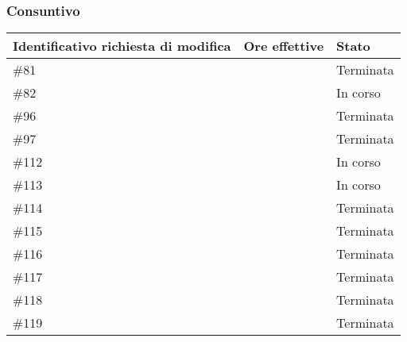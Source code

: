 \subsubsection{Consuntivo}

\begin{table}[H]
    \centering
        \begin{tabular}{| l | l | l |}
            \hline
                \textbf{Identificativo richiesta di modifica} & 
                \textbf{Ore effettive} &
                \textbf{Stato}\\ 
    \hline
        \#81 &  & Terminata\\
    \hline
        \#82 &  & In corso\\
    \hline
        \#96 &  & Terminata\\
    \hline
        \#97 &  & Terminata\\
    \hline
        \#112 &  & In corso\\
    \hline
        \#113 &  & In corso\\
    \hline
        \#114 & & Terminata\\
    \hline
        \#115 &  & Terminata\\
    \hline
        \#116 &  & Terminata\\
    \hline
        \#117 & & Terminata\\
    \hline
        \#118 & & Terminata\\
    \hline
        \#119 &  & Terminata\\
    \hline
    \end{tabular}
\end{table}
